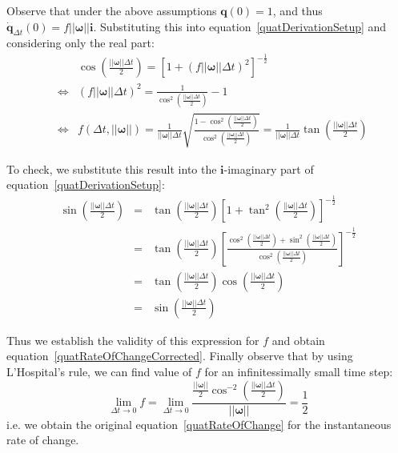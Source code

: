 Observe that under the above assumptions $\mathbf{q}(0) = 1$, and thus
$\dot{\mathbf{q}}_{\Delta t}(0) = f ||\bm{\omega}|| \mathbf{i}$. Substituting this
into equation~\ref{quatDerivationSetup} and considering only the real part:
\begin{eqnarray*}
&& \cos\left(\frac{||\bm{\omega}||\Delta t}{2}\right) =
    \left[1 + \left( f ||\bm{\omega}||\Delta t \right)^2 \right]^{-\frac{1}{2}} \\
&\Leftrightarrow&
    \left( f ||\bm{\omega}||\Delta t \right)^2 =
    \frac{1}{\cos^2\left(\frac{||\bm{\omega}||\Delta t}{2}\right)} - 1 \\
&\Leftrightarrow&
    f(\Delta t, ||\bm{\omega}||) =
    \frac{1}{||\bm{\omega}||\Delta t} \sqrt{\frac{
        1 - \cos^2\left(\frac{||\bm{\omega}||\Delta t}{2}\right)}{
        \cos^2\left(\frac{||\bm{\omega}||\Delta t}{2}\right)}} =
    \frac{1}{||\bm{\omega}||\Delta t}
        \tan\left(\frac{||\bm{\omega}||\Delta t}{2}\right)
\end{eqnarray*}

To check, we substitute this result into the $\mathbf{i}$-imaginary part of
equation~\ref{quatDerivationSetup}:
\begin{eqnarray*}
\sin\left(\frac{||\bm{\omega}||\Delta t}{2}\right) & = &
    \tan\left(\frac{||\bm{\omega}||\Delta t}{2}\right)
    \left[ 1 + \tan^2\left(\frac{||\bm{\omega}||\Delta t}{2}\right)
    \right]^{-\frac{1}{2}} \\
&=& \tan\left(\frac{||\bm{\omega}||\Delta t}{2}\right)
    \left[ \frac{\cos^2\left(\frac{||\bm{\omega}||\Delta t}{2}\right) +
    \sin^2\left(\frac{||\bm{\omega}||\Delta t}{2}\right) }{
    \cos^2\left(\frac{||\bm{\omega}||\Delta t}{2}\right) }
    \right]^{-\frac{1}{2}} \\
&=& \tan\left(\frac{||\bm{\omega}||\Delta t}{2}\right)
    \cos\left(\frac{||\bm{\omega}||\Delta t}{2}\right) \\
&=& \sin\left(\frac{||\bm{\omega}||\Delta t}{2}\right)
\end{eqnarray*}

Thus we establish the validity of this expression for $f$ and obtain
equation~\ref{quatRateOfChangeCorrected}. Finally observe that by using L'Hospital's rule,
we can find value of $f$ for an infinitessimally small time step:
$$
\lim_{\Delta t \to 0} f = \lim_{\Delta t \to 0} \frac{ \frac{||\bm{\omega}||}{2}
    \cos^{-2}\left(\frac{||\bm{\omega}||\Delta t}{2}\right) }{ ||\bm{\omega}|| } =
    \frac{1}{2}
$$
i.e. we obtain the original equation~\ref{quatRateOfChange} for the
instantaneous rate of change.
